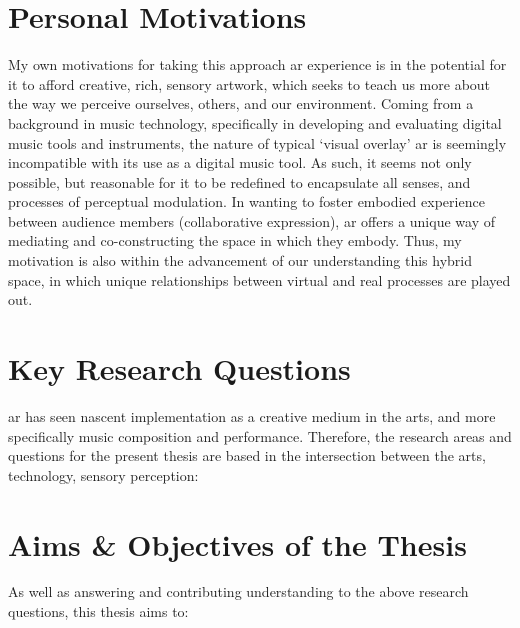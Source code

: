 \section{Personal Motivations}\label{sec: introduction-motivations}
My own motivations for taking this approach \ac{ar} experience is in the potential for it to afford creative, rich, sensory artwork, which seeks to teach us more about the way we perceive ourselves, others, and our environment. Coming from a background in music technology, specifically in developing and evaluating digital music tools and instruments, the nature of typical `visual overlay' \ac{ar} is seemingly incompatible with its use as a digital music tool. As such, it seems not only possible, but reasonable for it to be redefined to encapsulate all senses, and processes of perceptual modulation. In wanting to foster embodied experience between audience members (collaborative expression), \ac{ar} offers a unique way of mediating and co-constructing the space in which they embody. Thus, my motivation is also within the advancement of our understanding this hybrid space, in which unique relationships between virtual and real processes are played out.



\section{Key Research Questions}\label{sec: introduction-researchquestions}
\ac{ar} has seen nascent implementation as a creative medium in the arts, and more specifically music composition and performance. Therefore, the research areas and questions for the present thesis are based in the intersection between the arts, technology, sensory perception:

\RQall

\section{Aims \& Objectives of the Thesis}\label{sec: introduction-aims}
As well as answering and contributing understanding to the above research questions, this thesis aims to:


